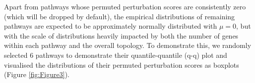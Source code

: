 \documentclass[9pt,a4paper,]{extarticle}
\newenvironment{Shaded}{\begin{snugshade}}{\end{snugshade}}
\newcommand{\AttributeTok}[1]{\textcolor[rgb]{0.13,0.29,0.53}{#1}}
\newcommand{\FunctionTok}[1]{\textcolor[rgb]{0.13,0.29,0.53}{\textbf{#1}}}
\newcommand{\NormalTok}[1]{#1}
\newcommand{\OtherTok}[1]{\textcolor[rgb]{0.56,0.35,0.01}{#1}}
\newcommand{\SpecialCharTok}[1]{\textcolor[rgb]{0.81,0.36,0.00}{\textbf{#1}}}
\begin{document}
\begin{Shaded}
\end{Shaded}

Apart from pathways whose permuted perturbation scores are consistently zero (which will be dropped by default), the empirical distributions of remaining pathways are expected to be approximately normally distributed with \(\mu = 0\), but with the scale of distributions heavily impacted by both the number of genes within each pathway and the overall topology.
To demonstrate this, we randomly selected 6 pathways to demonstrate their quantile-quantile (q-q) plot and visualised the distributions of their permuted perturbation scores as boxplots (Figure \ref{fig:Figure3}).
\end{document}
